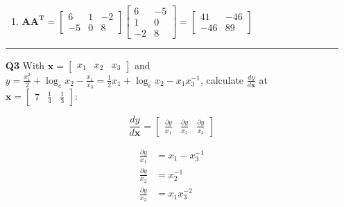 \documentclass[letterpaper,12pt]{article}
\begin{document}
\begin{itemize}
\begin{enumerate}
            \item $\mathbf{AA^{T}} = \begin{bmatrix}
                                        6 & 1 & -2 \\
                                        -5 & 0 & 8    
                                    \end{bmatrix} \begin{bmatrix}
                                        6 & -5 \\
                                        1 & 0 \\
                                        -2 & 8   
                                    \end{bmatrix} 
                                    = \begin{bmatrix}
                                        41 & -46 \\
                                        -46 & 89
                                    \end{bmatrix}$
        \end{enumerate}


    \vspace{2mm}
    \hrule
    \vspace{2mm}

    \item[\textbf{Q3}] With $\mathbf{x} = \begin{bmatrix} x_1 & x_2 & x_3 \end{bmatrix}$ and $y = \frac{x_{1}^{2}}{2} + \log_{e} x_{2} - \frac{x_1}{x_3} = \frac{1}{2} x_1 + \log_{e} x_{2} - x_{1} x_{3}^{-1} $, calculate $\frac{dy}{d\mathbf{x}}$ at $\mathbf{x} = \begin{bmatrix} 7 & \frac{1}{4} & \frac{1}{3} \end{bmatrix}$:
    
        \[
            \frac{dy}{d\mathbf{x}} = \begin{bmatrix} \frac{\partial y}{x_1} & \frac{\partial y}{x_2} & \frac{\partial y}{x_3} \end{bmatrix}
        \]

        \[
            \begin{split}
                \frac{\partial y}{x_1} & = x_{1} - x_{3}^{-1} \\
                \frac{\partial y}{x_2} & = x_{2}^{-1} \\
                \frac{\partial y}{x_3} & = x_{1} x_{3}^{-2}
            \end{split}
        \]


\end{itemize}
\end{document}
